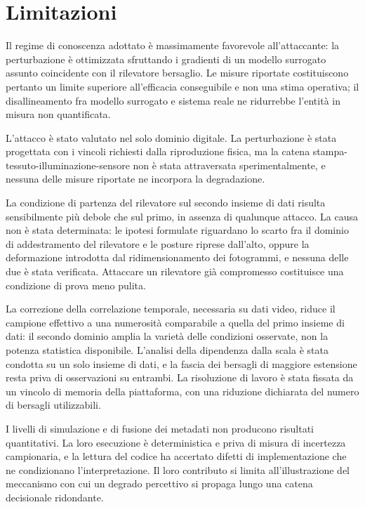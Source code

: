 \documentclass[a4paper,12pt]{report}
\begin{document}
\section{Limitazioni}

Il regime di conoscenza adottato è massimamente favorevole all'attaccante: la perturbazione è ottimizzata sfruttando i gradienti di un modello surrogato assunto coincidente con il rilevatore bersaglio. Le misure riportate costituiscono pertanto un limite superiore all'efficacia conseguibile e non una stima operativa; il disallineamento fra modello surrogato e sistema reale ne ridurrebbe l'entità in misura non quantificata.

L'attacco è stato valutato nel solo dominio digitale. La perturbazione è stata progettata con i vincoli richiesti dalla riproduzione fisica, ma la catena stampa-tessuto-illuminazione-sensore non è stata attraversata sperimentalmente, e nessuna delle misure riportate ne incorpora la degradazione.

La condizione di partenza del rilevatore sul secondo insieme di dati risulta sensibilmente più debole che sul primo, in assenza di qualunque attacco. La causa non è stata determinata: le ipotesi formulate riguardano lo scarto fra il dominio di addestramento del rilevatore e le posture riprese dall'alto, oppure la deformazione introdotta dal ridimensionamento dei fotogrammi, e nessuna delle due è stata verificata. Attaccare un rilevatore già compromesso costituisce una condizione di prova meno pulita.

La correzione della correlazione temporale, necessaria su dati video, riduce il campione effettivo a una numerosità comparabile a quella del primo insieme di dati: il secondo dominio amplia la varietà delle condizioni osservate, non la potenza statistica disponibile. L'analisi della dipendenza dalla scala è stata condotta su un solo insieme di dati, e la fascia dei bersagli di maggiore estensione resta priva di osservazioni su entrambi. La risoluzione di lavoro è stata fissata da un vincolo di memoria della piattaforma, con una riduzione dichiarata del numero di bersagli utilizzabili.

I livelli di simulazione e di fusione dei metadati non producono risultati quantitativi. La loro esecuzione è deterministica e priva di misura di incertezza campionaria, e la lettura del codice ha accertato difetti di implementazione che ne condizionano l'interpretazione. Il loro contributo si limita all'illustrazione del meccanismo con cui un degrado percettivo si propaga lungo una catena decisionale ridondante.
\end{document}
